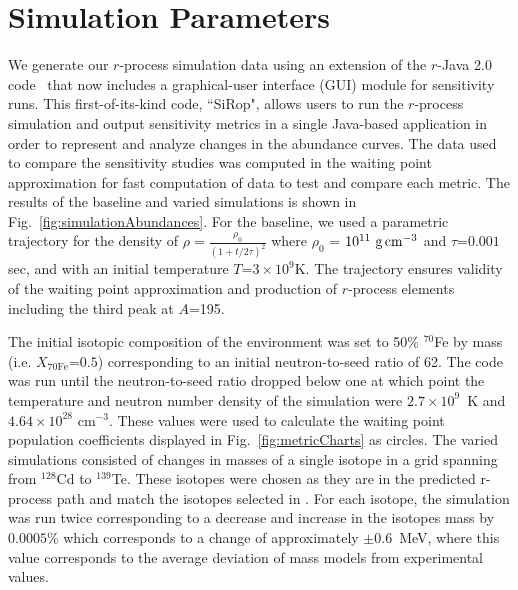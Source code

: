 \documentclass[aps,prc,reprint,showpacs,floatfix,nofootinbib]{revtex4-1}
\begin{document}
\section{Simulation Parameters}
\label{sec:simulation}
We generate our $r$-process simulation data using an extension of the $r$-Java 2.0 code~\cite{2014A&A...568A..97K,2014arXiv1402.3824K} that now includes a graphical-user interface (GUI) module for sensitivity runs. This first-of-its-kind code, ``SiRop", allows users to run the $r$-process simulation and output sensitivity metrics in a single Java-based application in order to represent and analyze changes in the abundance curves.
The data used to compare the sensitivity studies was computed in the waiting point approximation for fast 
computation of data to test and compare each metric. The results of the baseline and varied simulations is 
shown in Fig.~\ref{fig:simulationAbundances}. For the baseline, we used a parametric trajectory for the density of $\rho = \frac{\rho_0}{(1+t/2\tau)^2}$ 
where $\rho_0$ = $10^{11} \textrm{~g\,cm}^{-3}$ and $\tau$=$0.001$ sec, and with an initial temperature  $T$=$3\times 10^9 \textrm{K}$. The trajectory ensures validity of the waiting point approximation and production of $r$-process elements including the third peak at $A$=195. 

The initial isotopic 
composition of the environment was set to 50\% $^{70}$Fe by mass (i.e. $X_{70\textrm{Fe}}$=$0.5$) corresponding to an initial 
neutron-to-seed ratio of 62. The code was run until the neutron-to-seed ratio 
dropped below one at which point the temperature and neutron number density of the 
simulation were $2.7\times10^9$~K and $4.64\times10^{28} \textrm{~cm}^{-3}$.  These values 
were used to calculate the waiting point population coefficients displayed in 
Fig.~\ref{fig:metricCharts} as circles. The varied simulations consisted of changes in masses of a single isotope in a grid 
spanning from $^{128}$Cd to $^{139}$Te. These isotopes were chosen as they are in the predicted r-process path and match the 
isotopes selected in \citet{2009PhRvC..79d5809S}. For each isotope, the simulation was run twice corresponding to a decrease and increase in 
the isotopes mass by $0.0005\%$ which corresponds to a change of approximately $\pm$0.6~MeV, where this value corresponds to the average deviation of 
mass models from experimental values. 
\end{document}

